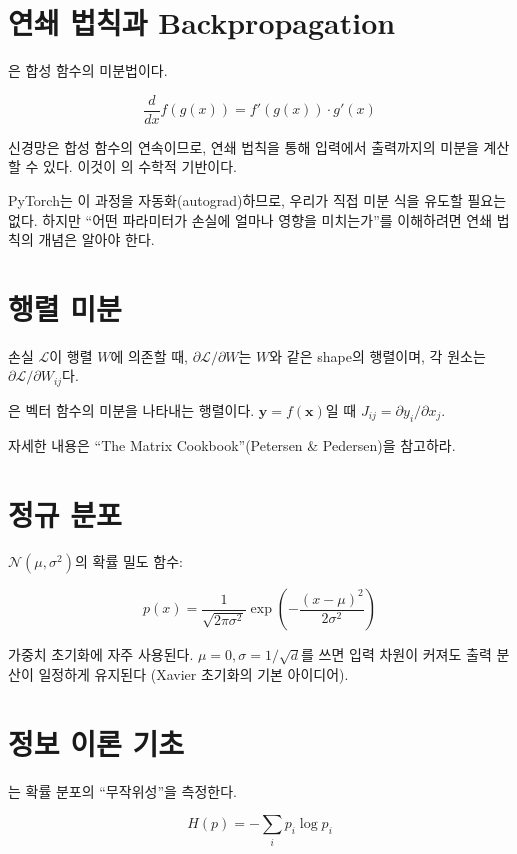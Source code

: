 \section{연쇄 법칙과 Backpropagation}

은 합성 함수의 미분법이다.

\[
\frac{d}{dx} f(g(x)) = f'(g(x)) \cdot g'(x)
\]

신경망은 합성 함수의 연속이므로, 연쇄 법칙을 통해 입력에서 출력까지의 미분을 계산할 수 있다. 이것이 의 수학적 기반이다.

PyTorch는 이 과정을 자동화(autograd)하므로, 우리가 직접 미분 식을 유도할 필요는 없다. 하지만 ``어떤 파라미터가 손실에 얼마나 영향을 미치는가''를 이해하려면 연쇄 법칙의 개념은 알아야 한다.

\section{행렬 미분}

손실 $\mathcal{L}$이 행렬 $W$에 의존할 때, $\partial \mathcal{L} / \partial W$는 $W$와 같은 shape의 행렬이며, 각 원소는 $\partial \mathcal{L} / \partial W_{ij}$다.

은 벡터 함수의 미분을 나타내는 행렬이다. $\mathbf{y} = f(\mathbf{x})$일 때 $J_{ij} = \partial y_i / \partial x_j$.

자세한 내용은 ``The Matrix Cookbook''(Petersen \& Pedersen)을 참고하라.

\section{정규 분포}

 $\mathcal{N}(\mu, \sigma^2)$의 확률 밀도 함수:

\[
p(x) = \frac{1}{\sqrt{2\pi\sigma^2}} \exp\left(-\frac{(x-\mu)^2}{2\sigma^2}\right)
\]

가중치 초기화에 자주 사용된다. $\mu=0, \sigma = 1/\sqrt{d}$를 쓰면 입력 차원이 커져도 출력 분산이 일정하게 유지된다 (Xavier 초기화의 기본 아이디어).

\section{정보 이론 기초}

는 확률 분포의 ``무작위성''을 측정한다.

\[
H(p) = -\sum_i p_i \log p_i
\]

